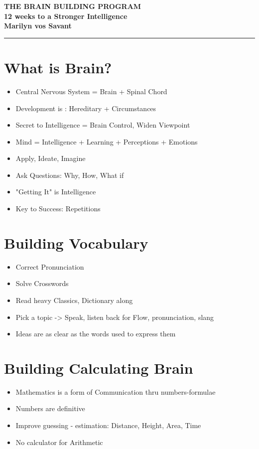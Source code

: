 


\raggedright
\footnotesize


\begin{center}
     \Large{\textbf{THE BRAIN BUILDING PROGRAM \\
			12 weeks to a Stronger Intelligence  \\ Marilyn vos Savant }}  
\end{center}

\rule{\linewidth}{0.25pt}
\begin{multicols}{3}

\section{What is Brain?}
\begin{itemize}[noitemsep,nolistsep]
\item Central Nervous System = Brain + Spinal Chord
\item Development is : Hereditary + Circumstances
\item Secret to Intelligence = Brain Control, Widen Viewpoint
\item Mind = Intelligence + Learning + Perceptions + Emotions
\item Apply, Ideate, Imagine
\item Ask Questions: Why, How, What if
\item "Getting It" is Intelligence
\item Key to Success: Repetitions
\end{itemize}

\section{Building Vocabulary}
\begin{itemize}[noitemsep,nolistsep]
\item Correct Pronunciation
\item Solve Crosswords
\item Read heavy Classics, Dictionary along
\item Pick a topic -> Speak, listen back for Flow, pronunciation, slang
\item Ideas are as clear as the words used to express them
\end{itemize}

\section{Building Calculating Brain}
\begin{itemize}[noitemsep,nolistsep]
\item Mathematics is a form of Communication thru numbers-formulae
\item Numbers are definitive
\item Improve guessing - estimation: Distance, Height, Area, Time
\item No calculator for Arithmetic
\end{itemize}


\end{multicols}
